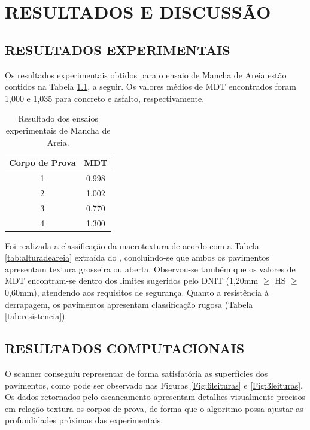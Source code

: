 \chapter{RESULTADOS E DISCUSSÃO}\label{CAP4}

\section{RESULTADOS EXPERIMENTAIS}
Os resultados experimentais obtidos para o ensaio de Mancha de Areia estão contidos na Tabela \ref{tab:manchadeareia_resultados}, a seguir. Os valores médios de MDT encontrados foram 1,000 e 1,035 para concreto e asfalto, respectivamente. 

\begin{table}[htb!]
\centering
\caption{Resultado dos ensaios experimentais de Mancha de Areia.}
\label{tab:manchadeareia_resultados}
\begin{tabular}{cc}
\hline
Corpo de Prova & \multicolumn{1}{c}{MDT} \\ \hline
1              & 0.998                            \\
2              & 1.002                            \\
3              & 0.770                            \\
4              & 1.300                            \\ \hline
\end{tabular}
\end{table}

Foi realizada a classificação da macrotextura de acordo com a Tabela \ref{tab:alturadeareia} extraída do , concluindo-se que ambos os pavimentos apresentam textura grosseira ou aberta. Observou-se também que os valores de MDT encontram-se dentro dos limites sugeridos pelo DNIT (1,20mm $\geq$ HS $\geq$ 0,60mm), atendendo aos requisitos de segurança. Quanto a resistência à derrapagem, os pavimentos apresentam classificação rugosa (Tabela \ref{tab:resistencia}).

\section{RESULTADOS COMPUTACIONAIS}
O scanner conseguiu representar de forma satisfatória as superfícies dos pavimentos, como pode ser observado nas Figuras \ref{Fig:6leituras} e \ref{Fig:3leituras}. Os dados retornados pelo escaneamento apresentam detalhes visualmente precisos em relação textura os corpos de prova, de forma que o algoritmo possa ajustar as profundidades próximas das experimentais.

